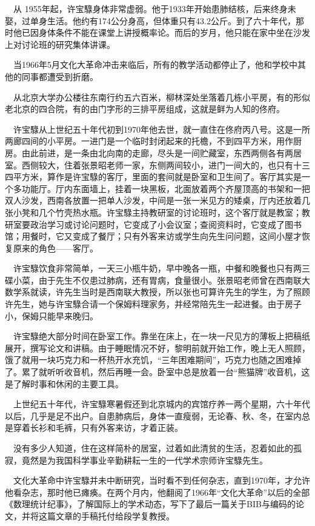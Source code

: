 \documentclass[a4paper,AutoFakeBold,oneside,12pt]{article}
\begin{document}
$\quad$从 1955年起，许宝騄身体非常虚弱。他于1933年开始患肺结核，后来终身未娶，过单身生活。他约有174公分身高，但体重只有43.2公斤。到了六十年代，那时他已因身体条件不能在课堂上讲授概率论。而后的岁月，他只能在家中坐在沙发上对讨论班的研究集体讲课。

	$\quad$当1966年5月文化大革命冲击来临后，所有的教学活动都停止了，他和学校中其他的同事都遭受到折磨。

$\quad$从北京大学办公楼往东南行约五六百米，柳林深处坐落着几栋小平房，有的形似老北京的四合院，有的由门字形的三排平房组成，这就是鲜为人知的佟府。

$\quad$许宝騄从上世纪五十年代初到1970年他去世，就一直住在佟府丙八号。这是一所两廊四间的小平房。一进门是一个临时封闭起来的托檐，不到四平方米，用作厨房。由此前进，是一条由北向南的走廊，尽头是一间贮藏室，东西两侧各有两居室。西侧较大，住着张景昭老师一家，东侧两间较小，进门一间大的，也只有十三四平方米，算作是许宝騄的客厅，里面的套间就是卧室和卫生间了。客厅其实是一个多功能厅。厅内东面墙上，挂着一块黑板，北面放着两个齐屋顶高的书架和一把双人沙发，西南各放置一把单人沙发，中间是一张一米见方的矮桌，厅内还放着几张小凳和几个竹壳热水瓶。许宝騄主持教研室的讨论班时，这个客厅就是教室；教研室要政治学习或讨论问题时，它变成了小会议室；查阅资料时，它变成了图书馆；用餐时，它又变成了餐厅；只有外客来访或学生向先生问问题，这间小屋才恢复原来的角色——客厅。

	$\quad$许宝騄饮食非常简单，一天三小瓶牛奶，早中晚各一瓶，中餐和晚餐也只有两三碟小菜，由于先生不仅患过肺病，还有胃病，食量很小。张景昭老师曾在西南联大数学系就读，许先生当时是西南联大教授，所以张也可算许先生的学生，为了照顾许先生，她与许宝騄合请一个保姆料理家务，并经常陪先生一起进餐。由于房子小，保姆只能早来晚归。

$\quad$许宝騄绝大部分时间在卧室工作。靠坐在床上，在一块一尺见方的薄板上把稿纸展开，撰写论文和讲稿。由于睡眠情况不好，黎明前就开始工作，晚上无人照顾，饿了就用一块巧克力和一杯热开水充饥，“三年困难期间”，巧克力也随之困难掉了。累了就听听收音机，然后再睡一会。卧室中总是放着一台“熊猫牌”收音机，这是了解时事和休闲的主要工具。

	$\quad$上世纪五十年代，许宝騄寒暑假还到北京城内的宾馆疗养一两个星期，六十年代以后，几乎是足不出户。自患肺病后，身体一直瘦弱，无论春、秋、冬，在室内总是穿着长衫和毛裤，只有外客来访，才着正装。

$\quad$没有多少人知道，住在这样简朴的居室，过着如此清贫的生活，忍着如此的孤寂，竟然是为我国科学事业辛勤耕耘一生的一代学术宗师许宝騄先生。

$\quad$文化大革命中许宝騄并未中断研究，当时看不到任何杂志，直到1970年，才允许他看杂志，那时他已瘫痪。在两个月内，他翻阅了1966年“文化大革命”以后的全部《数理统计纪事》，了解国际上的学术动态，写下了最后一篇关于BIB与编码的论文，并将这篇文章的手稿托付给段学复教授。
\end{document}
